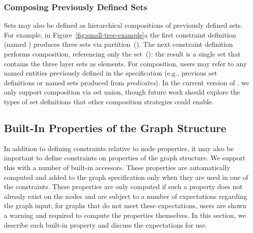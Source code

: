 \vspace{10px}
\subsubsection{Composing Previously Defined Sets}
Sets may also be defined as hierarchical
compositions of previously defined sets. For example, in
Figure~\ref{fig:small-tree-example}a the first constraint definition
(named ) produces three sets via
partition~(). The next constraint definition performs 
composition, referencing only the  set~(): the result
is a single set that contains the three layer sets as elements.
For composition, users may
refer to any named entities previously defined in the specification (e.g.,
previous set definitions or named sets produced from \emph{predicates}).
In the current version of \projectname, we only support composition via
set union, though future work should explore the types of set definitions
that other composition strategies could enable.

\subsection{Built-In Properties of the Graph Structure}
\label{sec:built-in-properties}

In addition to defining constraints relative to node properties, it may
also be important to define constraints on properties
of the graph structure.  We support this with a number of built-in accessors.
These properties are automatically computed and added to the graph 
specification only when they are used in one of the \projectname constraints. 
These properties are only computed if such a property does not
already exist on the nodes and are subject to a number of expectations
regarding the graph input; for graphs that do not meet these expectations,
users are shown a warning and required to compute the properties
themselves. In this section, we describe each built-in property and discuss 
the expectations for use.


